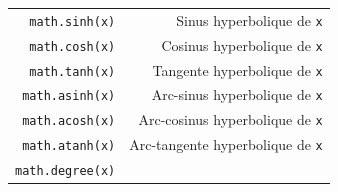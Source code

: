\documentclass[12pt,]{book}
\numberwithin{equation}{section}
\numberwithin{countremarque}{section}
\begin{document}
\begin{longtable}[]{@{}rr@{}}
\begin{minipage}[t]{0.21\columnwidth}\raggedleft\strut
\texttt{math.sinh(x)}\strut
\end{minipage} & \begin{minipage}[t]{0.60\columnwidth}\raggedleft\strut
Sinus hyperbolique de \texttt{x}\strut
\end{minipage}\tabularnewline
\begin{minipage}[t]{0.21\columnwidth}\raggedleft\strut
\texttt{math.cosh(x)}\strut
\end{minipage} & \begin{minipage}[t]{0.60\columnwidth}\raggedleft\strut
Cosinus hyperbolique de \texttt{x}\strut
\end{minipage}\tabularnewline
\begin{minipage}[t]{0.21\columnwidth}\raggedleft\strut
\texttt{math.tanh(x)}\strut
\end{minipage} & \begin{minipage}[t]{0.60\columnwidth}\raggedleft\strut
Tangente hyperbolique de \texttt{x}\strut
\end{minipage}\tabularnewline
\begin{minipage}[t]{0.21\columnwidth}\raggedleft\strut
\texttt{math.asinh(x)}\strut
\end{minipage} & \begin{minipage}[t]{0.60\columnwidth}\raggedleft\strut
Arc-sinus hyperbolique de \texttt{x}\strut
\end{minipage}\tabularnewline
\begin{minipage}[t]{0.21\columnwidth}\raggedleft\strut
\texttt{math.acosh(x)}\strut
\end{minipage} & \begin{minipage}[t]{0.60\columnwidth}\raggedleft\strut
Arc-cosinus hyperbolique de \texttt{x}\strut
\end{minipage}\tabularnewline
\begin{minipage}[t]{0.21\columnwidth}\raggedleft\strut
\texttt{math.atanh(x)}\strut
\end{minipage} & \begin{minipage}[t]{0.60\columnwidth}\raggedleft\strut
Arc-tangente hyperbolique de \texttt{x}\strut
\end{minipage}\tabularnewline
\begin{minipage}[t]{0.21\columnwidth}\raggedleft\strut
\texttt{math.degree(x)}\strut
\end{minipage} & \begin{minipage}[t]{0.60\columnwidth}\raggedleft\strut

\end{minipage}
\end{longtable}
\end{document}
